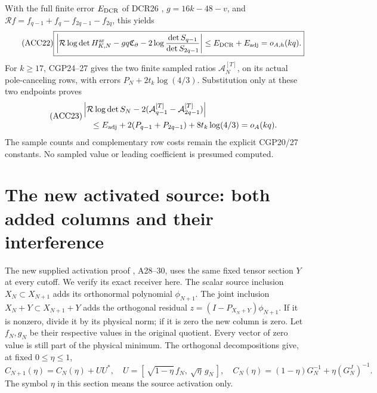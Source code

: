 \documentclass[11pt]{article}
\begin{document}
With the full finite error \(E_{\rm DCR}\) of DCR26 \cite{ACCDCR},
\(g=16k-48-v\), and
\(\mathcal Rf=f_{q-1}+f_q-f_{2q-1}-f_{2q}\), this yields
\begin{equation}\tag{ACC22}
\boxed{\left|\mathcal R\log\det H_{K,N}^{\rm ar}
-gq\mathfrak C_\partial
-2\log\frac{\det S_{q-1}}{\det S_{2q-1}}\right|
\le E_{\rm DCR}+E_{\rm adj}=o_{A,h}(kq).}
\end{equation}
For \(k\ge17\), CGP24--27 \cite{ACCCGP} gives the two finite sampled
ratios \(\mathcal A_N^{[T]}\), on its actual pole-canceling rows,
with errors \(P_N+2t_k\log(4/3)\).
Substitution only at these two endpoints proves
\begin{equation}\tag{ACC23}
\begin{aligned}
&\left|\mathcal R\log\det S_N
-2(\mathcal A_{q-1}^{[T]}-\mathcal A_{2q-1}^{[T]})\right|\\
&\quad\le E_{\rm adj}+2(P_{q-1}+P_{2q-1})+8t_k\log(4/3)=o_A(kq).
\end{aligned}
\end{equation}
The sample counts and complementary row costs remain the explicit
CGP20/27 constants. No sampled value or leading coefficient is
presumed computed.

\section{The new activated source: both added columns and their interference}
The new supplied activation proof \cite{ACCActivation}, A28--30, uses the
same fixed tensor section \(Y\) at every cutoff. We verify its exact
receiver here. The scalar source inclusion \(X_N\subset X_{N+1}\)
adds its orthonormal polynomial \(\phi_{N+1}\).
The joint inclusion \(X_N+Y\subset X_{N+1}+Y\) adds the orthogonal
residual \(z=(I-P_{X_N+Y})\phi_{N+1}\). If it is nonzero, divide it
by its physical norm; if it is zero the new column is zero.
Let \(f_N,g_N\) be their respective values in the original quotient.
Every vector of zero value is still part of the physical minimum.
The orthogonal decompositions give, at fixed \(0\le\eta\le1\),
\begin{equation}\tag{ACC24}
C_{N+1}(\eta)=C_N(\eta)+UU^*,\quad
U=[\,\sqrt{1-\eta}\,f_N,\ \sqrt\eta\,g_N\,],\quad
C_N(\eta)=(1-\eta)G_N^{-1}+\eta(G_N^J)^{-1}.
\end{equation}
The symbol \(\eta\) in this section means the source activation only.
\end{document}
